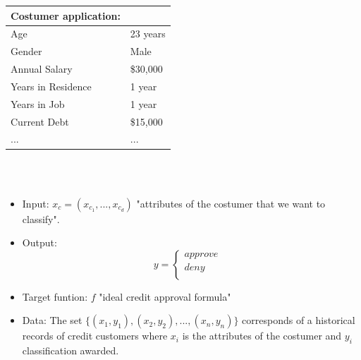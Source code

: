 \documentclass[../main.tex]{subfiles}
\begin{document}
	\begin{tabular}{ll}
		\toprule
		\textbf{Costumer application:}  \\ 
		\midrule
		Age & 23 years \\
		Gender & Male \\
		Annual Salary & \$30,000 \\
		Years in Residence & 1 year \\
		Years in Job & 1 year \\
		Current Debt & \$15,000 \\
		... & ... \\
		\bottomrule
	\end{tabular} 
	\\ \\
	\begin{itemize}
		\item Input: \textbf{$x_c=(x_{c_1},...,x_{c_d})$}  "attributes of the costumer that we want to classify". 
		\item Output:  
		\[
		y = \begin{cases}
			approve \\
			deny& \\
		\end{cases}
		\]
		
		\item Target funtion: $f$  "ideal credit approval formula"
		\item Data: The set $\{(x_1, y_1),(x_2,y_2),...,(x_n ,y_n)\}$ corresponds of a historical records of credit customers where $x_i$ is the attributes of the costumer and $y_i$ classification awarded.
	\end{itemize}
	
\end{document}
